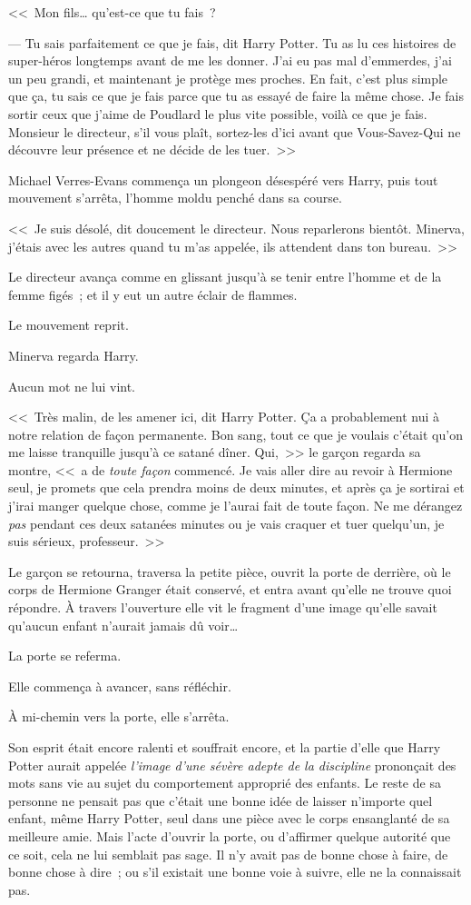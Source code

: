 <<~Mon fils… qu'est-ce que tu fais~?

--- Tu sais parfaitement ce que je fais, dit Harry Potter. Tu as lu ces histoires de super-héros longtemps avant de me les donner. J'ai eu pas mal d'emmerdes, j'ai un peu grandi, et maintenant je protège mes proches. En fait, c'est plus simple que ça, tu sais ce que je fais parce que tu as essayé de faire la même chose. Je fais sortir ceux que j'aime de Poudlard le plus vite possible, voilà ce que je fais. Monsieur le directeur, s'il vous plaît, sortez-les d'ici avant que Vous-Savez-Qui ne découvre leur présence et ne décide de les tuer.~>>

Michael Verres-Evans commença un plongeon désespéré vers Harry, puis tout mouvement s'arrêta, l'homme moldu penché dans sa course.

<<~Je suis désolé, dit doucement le directeur. Nous reparlerons bientôt. Minerva, j'étais avec les autres quand tu m'as appelée, ils attendent dans ton bureau.~>>

Le directeur avança comme en glissant jusqu'à se tenir entre l'homme et de la femme figés~; et il y eut un autre éclair de flammes.

Le mouvement reprit.

Minerva regarda Harry.

Aucun mot ne lui vint.

<<~Très malin, de les amener ici, dit Harry Potter. Ça a probablement nui à notre relation de façon permanente. Bon sang, tout ce que je voulais c'était qu'on me laisse tranquille jusqu'à ce satané dîner. Qui,~>> le garçon regarda sa montre, <<~a de \emph{toute façon} commencé. Je vais aller dire au revoir à Hermione seul, je promets que cela prendra moins de deux minutes, et après ça je sortirai et j'irai manger quelque chose, comme je l'aurai fait de toute façon. Ne me dérangez \emph{pas} pendant ces deux satanées minutes ou je vais craquer et tuer quelqu'un, je suis sérieux, professeur.~>>

Le garçon se retourna, traversa la petite pièce, ouvrit la porte de derrière, où le corps de Hermione Granger était conservé, et entra avant qu'elle ne trouve quoi répondre. À travers l'ouverture elle vit le fragment d'une image qu'elle savait qu'aucun enfant n'aurait jamais dû voir…

La porte se referma.

Elle commença à avancer, sans réfléchir.

À mi-chemin vers la porte, elle s'arrêta.

Son esprit était encore ralenti et souffrait encore, et la partie d'elle que Harry Potter aurait appelée \emph{l'image d'une sévère adepte de la discipline} prononçait des mots sans vie au sujet du comportement approprié des enfants. Le reste de sa personne ne pensait pas que c'était une bonne idée de laisser n'importe quel enfant, même Harry Potter, seul dans une pièce avec le corps ensanglanté de sa meilleure amie. Mais l'acte d'ouvrir la porte, ou d'affirmer quelque autorité que ce soit, cela ne lui semblait pas sage. Il n'y avait pas de bonne chose à faire, de bonne chose à dire~; ou s'il existait une bonne voie à suivre, elle ne la connaissait pas.

